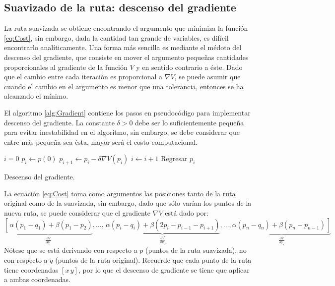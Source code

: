 \documentclass[letterpaper,12pt]{article}
\newcommand\ddfrac[2]{\frac{\displaystyle #1}{\displaystyle #2}}
\begin{document}
\subsection{Suavizado de la ruta: descenso del gradiente}
La ruta suavizada se obtiene encontrando el argumento que minimiza la función \ref{eq:Cost}, sin embargo, dada la cantidad tan grande de variables, es difícil encontrarlo analíticamente. Una forma más sencilla es mediante el médoto del descenso del gradiente, que consiste en mover el argumento pequeñas cantidades proporcionales al gradiente de la función $V$ y en sentido contrario a éste. Dado que el cambio entre cada iteración es proporcional a $\nabla V$, se puede asumir que cuando el cambio en el argumento es menor que una tolerancia, entonces se ha alcanzado el mínimo. 

El algoritmo \ref{alg:Gradient} contiene los pasos en pseudocódigo para implementar descenso del gradiente. La constante $\delta > 0$ debe ser lo suficientemente pequeña para evitar inestabilidad en el algoritmo, sin embargo, se debe considerar que entre más pequeña sea ésta, mayor será el costo computacional. 

\begin{algorithm}
\DontPrintSemicolon
{}
$i = 0$\;
$p_i \leftarrow p(0)$\;
{
\BlankLine
  $p_{i+1} \leftarrow p_i - \delta\nabla V(p_i)$\;
  $i \leftarrow i+1$
\BlankLine
}
Regresar $p_i$
\caption{Descenso del gradiente.}
\label{alg:Gradient}
\end{algorithm}

La ecuación \ref{eq:Cost} toma como argumentos las posiciones tanto de la ruta original como de la suavizada, sin embargo, dado que sólo varían los puntos de la nueva ruta, se puede considerar que el gradiente $\nabla V$ está dado por:
\begin{equation}
\underbrace{\left[\frac{}{}\alpha(p_1 - q_1)+\beta(p_1 - p_2)\right.}_{\ddfrac{\partial V}{\partial p_1}}
,\dots ,
\underbrace{\frac{}{}\alpha(p_i - q_i) + \beta(2p_i - p_{i-1} - p_{i+1})}_{\ddfrac{\partial V}{\partial p_i}}
,\dots ,
\underbrace{\left.\alpha(p_n-q_n)+\beta(p_n - p_{n-1})\frac{}{}\right]}_{\ddfrac{\partial V}{\partial p_n}}
\end{equation}
Nótese que se está derivando con respecto a $p$ (puntos de la ruta suavizada), no con respecto a $q$ (puntos de la ruta original). Recuerde que cada punto de la ruta tiene coordenadas $[x\,y]$, por lo que el descenso de gradiente se tiene que aplicar a ambas coordenadas. 
\end{document}
